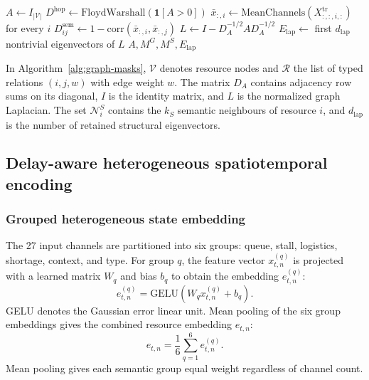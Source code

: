 \documentclass[a4paper,fleqn]{cas-dc}
\begin{document}
\begin{algorithm}[t]
\caption{Factory graph and attention-mask construction.}
\label{alg:graph-masks}
$A\leftarrow I_{|\mathcal{V}|}$\;
$D^{\mathrm{hop}}\leftarrow\mathrm{FloydWarshall}(\mathbf{1}[A>0])$\;
$\bar x_{:,i}\leftarrow\mathrm{MeanChannels}(X^{\mathrm{tr}}_{:,:,i,:})$ for every $i$\;
$D^{\mathrm{sem}}_{ij}\leftarrow1-\mathrm{corr}(\bar x_{:,i},\bar x_{:,j})$\;
$L\leftarrow I-D_A^{-1/2}AD_A^{-1/2}$\;
$E_{\mathrm{lap}}\leftarrow$ first $d_{\mathrm{lap}}$ nontrivial eigenvectors of $L$\;
\Return $A,M^G,M^S,E_{\mathrm{lap}}$\;
\end{algorithm}

In Algorithm~\ref{alg:graph-masks}, $\mathcal{V}$ denotes resource nodes and $\mathcal{R}$ the list of typed relations $(i,j,w)$ with edge weight $w$. The matrix $D_A$ contains adjacency row sums on its diagonal, $I$ is the identity matrix, and $L$ is the normalized graph Laplacian. The set $\mathcal{N}^{S}_i$ contains the $k_S$ semantic neighbours of resource $i$, and $d_{\mathrm{lap}}$ is the number of retained structural eigenvectors.

\subsection{Delay-aware heterogeneous spatiotemporal encoding}



\subsubsection{Grouped heterogeneous state embedding}

The 27 input channels are partitioned into six groups: queue, stall, logistics, shortage, context, and type. For group $q$, the feature vector $x^{(q)}_{t,n}$ is projected with a learned matrix $W_q$ and bias $b_q$ to obtain the embedding $e^{(q)}_{t,n}$:
\begin{equation}
e^{(q)}_{t,n}=\mathrm{GELU}
\left(W_q x^{(q)}_{t,n}+b_q\right).
\end{equation}
GELU denotes the Gaussian error linear unit. Mean pooling of the six group embeddings gives the combined resource embedding $e_{t,n}$:
\begin{equation}
e_{t,n}=\frac{1}{6}\sum_{q=1}^{6}e^{(q)}_{t,n}.
\end{equation}
Mean pooling gives each semantic group equal weight regardless of channel count.
\end{document}
